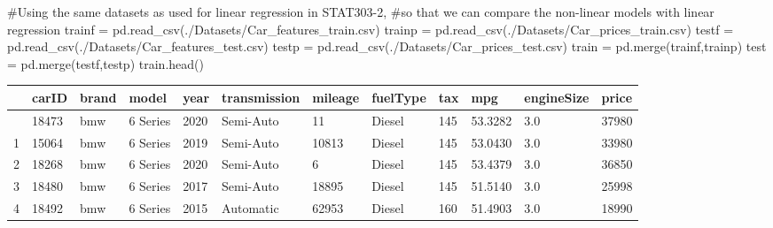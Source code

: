 \documentclass[
  letterpaper,
  DIV=11,
  numbers=noendperiod]{scrreprt}
\newenvironment{Shaded}{\begin{snugshade}}{\end{snugshade}}
\newcommand{\CommentTok}[1]{\textcolor[rgb]{0.37,0.37,0.37}{#1}}
\newcommand{\NormalTok}[1]{\textcolor[rgb]{0.00,0.23,0.31}{#1}}
\newcommand{\OperatorTok}[1]{\textcolor[rgb]{0.37,0.37,0.37}{#1}}
\newcommand{\StringTok}[1]{\textcolor[rgb]{0.13,0.47,0.30}{#1}}
\begin{document}
\begin{Shaded}
\begin{Highlighting}[]
\CommentTok{\#Using the same datasets as used for linear regression in STAT303{-}2, }
\CommentTok{\#so that we can compare the non{-}linear models with linear regression}
\NormalTok{trainf }\OperatorTok{=}\NormalTok{ pd.read\_csv(}\StringTok{\textquotesingle{}./Datasets/Car\_features\_train.csv\textquotesingle{}}\NormalTok{)}
\NormalTok{trainp }\OperatorTok{=}\NormalTok{ pd.read\_csv(}\StringTok{\textquotesingle{}./Datasets/Car\_prices\_train.csv\textquotesingle{}}\NormalTok{)}
\NormalTok{testf }\OperatorTok{=}\NormalTok{ pd.read\_csv(}\StringTok{\textquotesingle{}./Datasets/Car\_features\_test.csv\textquotesingle{}}\NormalTok{)}
\NormalTok{testp }\OperatorTok{=}\NormalTok{ pd.read\_csv(}\StringTok{\textquotesingle{}./Datasets/Car\_prices\_test.csv\textquotesingle{}}\NormalTok{)}
\NormalTok{train }\OperatorTok{=}\NormalTok{ pd.merge(trainf,trainp)}
\NormalTok{test }\OperatorTok{=}\NormalTok{ pd.merge(testf,testp)}
\NormalTok{train.head()}
\end{Highlighting}
\end{Shaded}

\begin{longtable}[]{@{}llllllllllll@{}}
\toprule\noalign{}
& carID & brand & model & year & transmission & mileage & fuelType & tax
& mpg & engineSize & price \\
\midrule\noalign{}
\endhead
\bottomrule\noalign{}
\endlastfoot
0 & 18473 & bmw & 6 Series & 2020 & Semi-Auto & 11 & Diesel & 145 &
53.3282 & 3.0 & 37980 \\
1 & 15064 & bmw & 6 Series & 2019 & Semi-Auto & 10813 & Diesel & 145 &
53.0430 & 3.0 & 33980 \\
2 & 18268 & bmw & 6 Series & 2020 & Semi-Auto & 6 & Diesel & 145 &
53.4379 & 3.0 & 36850 \\
3 & 18480 & bmw & 6 Series & 2017 & Semi-Auto & 18895 & Diesel & 145 &
51.5140 & 3.0 & 25998 \\
4 & 18492 & bmw & 6 Series & 2015 & Automatic & 62953 & Diesel & 160 &
51.4903 & 3.0 & 18990 \\
\end{longtable}
\end{document}
